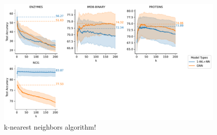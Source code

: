\begin{figure}
	\centering
	\includegraphics[width=\textwidth]{Figures/knn.pdf}
	\caption{k-nearest neighbors algorithm!}
\end{figure}

